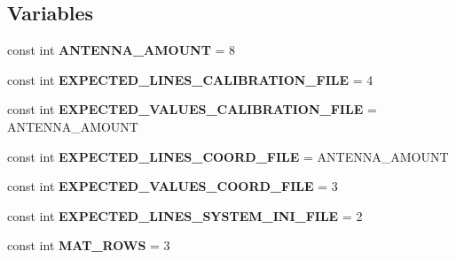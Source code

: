 \subsection*{Variables}
\begin{DoxyCompactItemize}
\item 
\hypertarget{namespace_p_r_p_s_evolution_ae8fd15954b83f65c6dfa876814a1923d}{const int {\bfseries A\-N\-T\-E\-N\-N\-A\-\_\-\-A\-M\-O\-U\-N\-T} = 8}\label{namespace_p_r_p_s_evolution_ae8fd15954b83f65c6dfa876814a1923d}

\item 
\hypertarget{namespace_p_r_p_s_evolution_ab66b487333f4f165dd621808ddc9ced1}{const int {\bfseries E\-X\-P\-E\-C\-T\-E\-D\-\_\-\-L\-I\-N\-E\-S\-\_\-\-C\-A\-L\-I\-B\-R\-A\-T\-I\-O\-N\-\_\-\-F\-I\-L\-E} = 4}\label{namespace_p_r_p_s_evolution_ab66b487333f4f165dd621808ddc9ced1}

\item 
\hypertarget{namespace_p_r_p_s_evolution_a184ab9c885da3e6b6ceb92842a67cd9d}{const int {\bfseries E\-X\-P\-E\-C\-T\-E\-D\-\_\-\-V\-A\-L\-U\-E\-S\-\_\-\-C\-A\-L\-I\-B\-R\-A\-T\-I\-O\-N\-\_\-\-F\-I\-L\-E} = A\-N\-T\-E\-N\-N\-A\-\_\-\-A\-M\-O\-U\-N\-T}\label{namespace_p_r_p_s_evolution_a184ab9c885da3e6b6ceb92842a67cd9d}

\item 
\hypertarget{namespace_p_r_p_s_evolution_a33b7e7ecb530354564d1d2a2b9030c05}{const int {\bfseries E\-X\-P\-E\-C\-T\-E\-D\-\_\-\-L\-I\-N\-E\-S\-\_\-\-C\-O\-O\-R\-D\-\_\-\-F\-I\-L\-E} = A\-N\-T\-E\-N\-N\-A\-\_\-\-A\-M\-O\-U\-N\-T}\label{namespace_p_r_p_s_evolution_a33b7e7ecb530354564d1d2a2b9030c05}

\item 
\hypertarget{namespace_p_r_p_s_evolution_a8ee3546294cfed4378ee79b70061a50e}{const int {\bfseries E\-X\-P\-E\-C\-T\-E\-D\-\_\-\-V\-A\-L\-U\-E\-S\-\_\-\-C\-O\-O\-R\-D\-\_\-\-F\-I\-L\-E} = 3}\label{namespace_p_r_p_s_evolution_a8ee3546294cfed4378ee79b70061a50e}

\item 
\hypertarget{namespace_p_r_p_s_evolution_a67748544fc929f79123675ac334b9e77}{const int {\bfseries E\-X\-P\-E\-C\-T\-E\-D\-\_\-\-L\-I\-N\-E\-S\-\_\-\-S\-Y\-S\-T\-E\-M\-\_\-\-I\-N\-I\-\_\-\-F\-I\-L\-E} = 2}\label{namespace_p_r_p_s_evolution_a67748544fc929f79123675ac334b9e77}

\item 
\hypertarget{namespace_p_r_p_s_evolution_aa19e4c2b7b2ab582072a916b8f68fce6}{const int {\bfseries M\-A\-T\-\_\-\-R\-O\-W\-S} = 3}\label{namespace_p_r_p_s_evolution_aa19e4c2b7b2ab582072a916b8f68fce6}


\end{DoxyCompactItemize}
